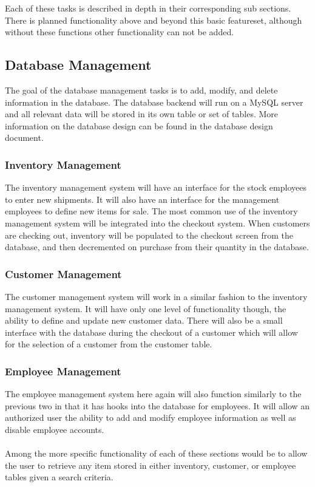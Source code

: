 \documentclass{book}
\begin{document}
Each of these tasks is described in depth in their corresponding sub sections. There is planned functionality above and beyond this basic featureset, although without these functions other functionality can not be added.

\subsection{Database Management}

The goal of the database management tasks is to add, modify, and delete information in the database. The database backend will run on a MySQL server and all relevant data will be stored in its own table or set of tables. More information on the database design can be found in the database design document.

\subsubsection{Inventory Management}
The inventory management system will have an interface for the stock employees to enter new shipments. It will also have an interface for the management employees to define new items for sale. The most common use of the inventory management system will be integrated into the checkout system. When customers are checking out, inventory will be populated to the checkout screen from the database, and then decremented on purchase from their quantity in the database.

\subsubsection{Customer Management}
The customer management system will work in a similar fashion to the inventory management system. It will have only one level of functionality though, the ability to define and update new customer data. There will also be a small interface with the database during the checkout of a customer which will allow for the selection of a customer from the customer table.

\subsubsection{Employee Management}
The employee management system here again will also function similarly to the previous two in that it has hooks into the database for employees. It will allow an authorized user the ability to add and modify employee information as well as disable employee accounts.\\
\\
Among the more specific functionality of each of these sections would be to allow the user to retrieve any item stored in either inventory, customer, or employee tables given a search criteria.
\end{document}
